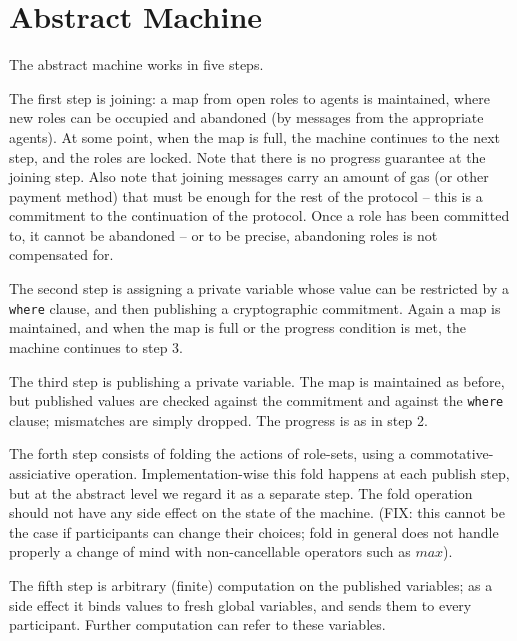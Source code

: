 \documentclass[acmsmall,review,anonymous]{acmart}\settopmatter{printfolios=true}
\begin{document}




\maketitle

\section{Abstract Machine}
The abstract machine works in five steps.

The first step is joining: a map from open roles to agents is maintained, where new roles can be occupied and abandoned (by messages from the appropriate agents). At some point, when the map is full, the machine continues to the next step, and the roles are locked. Note that there is no progress guarantee at the joining step. Also note that joining messages carry an amount of gas (or other payment method) that must be enough for the rest of the protocol -- this is a commitment to the continuation of the protocol. Once a role has been committed to, it cannot be abandoned -- or to be precise, abandoning roles is not compensated for.

The second step is assigning a private variable whose value can be restricted by a \texttt{where} clause, and then publishing a cryptographic commitment. Again a map is maintained, and when the map is full or the progress condition is met, the machine continues to step 3.

The third step is publishing a private variable. The map is maintained as before, but published values are checked against the commitment and against the \texttt{where} clause; mismatches are simply dropped. The progress is as in step 2.

The forth step consists of folding the actions of role-sets, using a commotative-assiciative operation. Implementation-wise this fold happens at each publish step, but at the abstract level we regard it as a separate step. The fold operation should not have any side effect on the state of the machine. (FIX: this cannot be the case if participants can change their choices; fold in general does not handle properly a change of mind with non-cancellable operators such as $max$).

The fifth step is arbitrary (finite) computation on the published variables; as a side effect it binds values to fresh global variables, and sends them to every participant. Further computation can refer to these variables.
\end{document}
